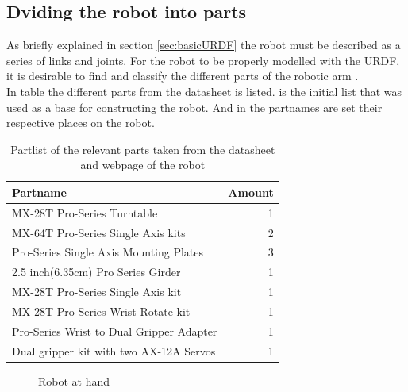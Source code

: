 \subsection{Dviding the robot into parts}
As briefly explained in section \ref{sec:basicURDF} the robot must be described as a series of links and joints. For the robot to be properly modelled with the URDF, it is desirable to find and classify the different parts of the robotic arm .  \\

In table  the different parts from the datasheet is listed.  is the initial list that was used as a base for constructing the robot. And in  the partnames are set their respective places on the robot. 

\begin{table}[htbp]
\centering
\caption{Partlist of the relevant parts taken from the datasheet and webpage of the robot}
\label{table:partlist}
    \begin{tabular}{ l r}
        \toprule
        Partname  & Amount \\
        \midrule
        MX-28T Pro-Series Turntable & 1\\
        MX-64T Pro-Series Single Axis kits& 2\\
        Pro-Series Single Axis Mounting Plates & 3\\
        2.5 inch(6.35cm) Pro Series Girder & 1 \\
        MX-28T Pro-Series Single Axis kit & 1 \\
        MX-28T Pro-Series Wrist Rotate kit & 1\\
        Pro-Series Wrist to Dual Gripper Adapter & 1\\
        Dual gripper kit with two AX-12A Servos& 1\\
               \bottomrule
    \end{tabular}
\end{table}



\begin{figure}[htbp]
  \centering
  
  \caption{Robot at hand}
  \label{fig:utgangspunkt}
\end{figure}



